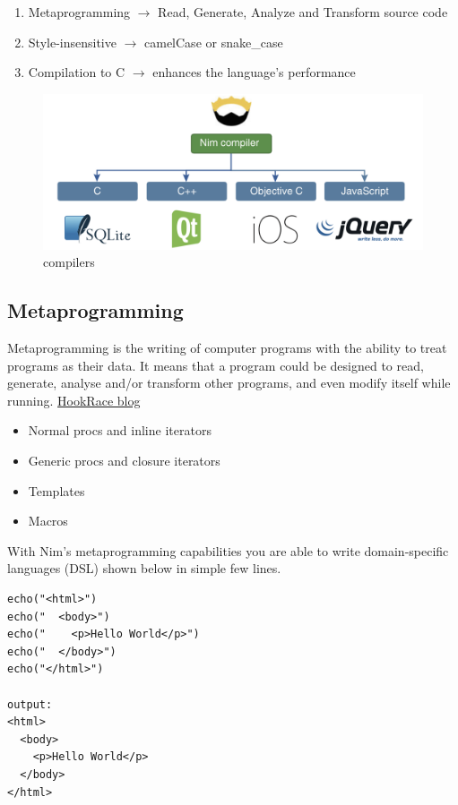 \documentclass[10pt, a4paper, twocolumn]{article} %
\begin{document}
\begin{enumerate}
	\item Metaprogramming $\longrightarrow$ Read, Generate, Analyze and Transform source code
	\item Style-insensitive $\longrightarrow$ camelCase or snake\_case
	\item Compilation to C $\longrightarrow$ enhances the language's performance
\end{enumerate}

\begin{figure}[h!]
	\includegraphics[width=\linewidth]{compiler.png} %
	\caption{compilers} %
	\label{Nim Compilers} %
\end{figure}
\newpage

\subsection{Metaprogramming}

Metaprogramming is the writing of computer programs with the ability to treat programs as their data. It means that a program could be designed to read, generate, analyse and/or transform other programs, and even modify itself while running. \href{https://hookrace.net/blog/introduction-to-metaprogramming-in-nim/}{HookRace blog}


\begin{itemize}
	\item Normal procs and inline iterators
	\item Generic procs  and closure iterators
	\item Templates
	\item Macros
\end{itemize}

With Nim's metaprogramming capabilities you are able to write domain-specific languages (DSL) shown below in simple few lines.

\begin{lstlisting}
echo("<html>")
echo("  <body>")
echo("    <p>Hello World</p>")
echo("  </body>")
echo("</html>")

output:
<html>
  <body>
    <p>Hello World</p>
  </body>
</html>
\end{lstlisting}
\end{document}
